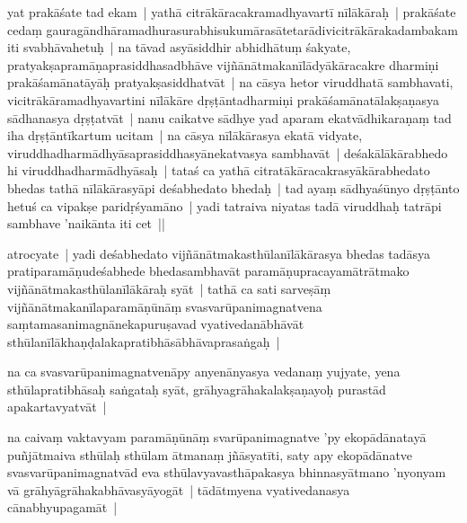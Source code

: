 \documentclass[article,12pt,a4paper]{memoir}%
\newcounter{parCount}
\begin{document}
	  \pstart \leavevmode%
	\label{thakur75-129.22}yat prakāśate tad ekam | yathā citrākāracakramadhyavartī nīlākāraḥ | prakāśate cedaṃ gauragāndhāramadhurasurabhisukumārasātetarādivicitrākārakadambakam iti svabhāvahetuḥ | \label{thakur75-129.25} na tāvad asyāsiddhir abhidhātuṃ śakyate, pratyakṣapramāṇaprasiddhasadbhāve vijñānātmakanīlādyākāracakre dharmiṇi prakāśamānatāyāḥ pratyakṣasiddhatvāt | na cāsya \leavevmode{}\label{thakur75-130} hetor viruddhatā sambhavati, vicitrākāramadhyavartini nīlākāre dṛṣṭāntadharmiṇi prakāśamānatālakṣaṇasya sādhanasya dṛṣṭatvāt | nanu caikatve sādhye yad aparam ekatvādhikaraṇaṃ tad iha dṛṣṭāntīkartum ucitam | na cāsya nīlākārasya ekatā vidyate, viruddhadharmādhyāsaprasiddhasyānekatvasya sambhavāt | deśakālākārabhedo hi viruddhadharmādhyāsaḥ | tataś ca yathā citratākāracakrasyākārabhedato bhedas tathā nīlākārasyāpi deśabhedato bhedaḥ | tad ayaṃ sādhyaśūnyo dṛṣṭānto hetuś ca vipakṣe paridṛśyamāno | yadi tatraiva niyatas tadā viruddhaḥ \label{thakur75-130.8} tatrāpi sambhave 'naikānta iti cet ||
	{}
	\pend%
      

	  \pstart \leavevmode%
	atrocyate | yadi deśabhedato vijñānātmakasthūlanīlākārasya bhedas tadāsya pratiparamāṇudeśabhede bhedasambhavāt paramāṇupracayamātrātmako vijñānātmakasthūlanīlākāraḥ syāt | tathā ca sati sarveṣāṃ vijñānātmakanīlaparamāṇūnāṃ svasvarūpanimagnatvena saṃtamasanimagnānekapuruṣavad vyativedanābhāvāt sthūlanīlākhaṇḍalakapratibhāsābhāvaprasaṅgaḥ |
	{}
	\pend%
      

	  \pstart \leavevmode%
	na ca svasvarūpanimagnatvenāpy anyenānyasya vedanaṃ yujyate, yena sthūlapratibhāsaḥ saṅgataḥ syāt, grāhyagrāhakalakṣaṇayoḥ purastād apakartavyatvāt |
	{}
	\pend%
      

	  \pstart \leavevmode%
	na caivaṃ vaktavyam paramāṇūnāṃ svarūpanimagnatve 'py ekopādānatayā puñjātmaiva sthūlaḥ sthūlam ātmanaṃ jñāsyatīti, saty apy ekopādānatve svasvarūpanimagnatvād eva sthūlavyavasthāpakasya bhinnasyātmano 'nyonyam vā grāhyāgrāhakabhāvasyāyogāt | tādātmyena vyativedanasya cānabhyupagamāt |
	{}
	\pend%
      
\end{document}
